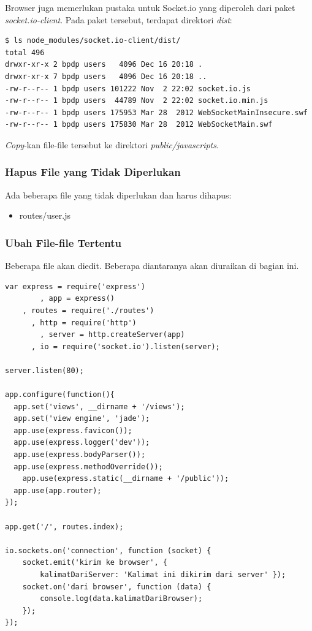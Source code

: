 Browser juga memerlukan pustaka untuk Socket.io yang diperoleh dari paket \textit{socket.io-client}. Pada paket tersebut, terdapat direktori \textit{dist}:

\lstset{language=Bash,caption=Isi direktori dist di socket.io-client}
\begin{lstlisting}
$ ls node_modules/socket.io-client/dist/
total 496
drwxr-xr-x 2 bpdp users   4096 Dec 16 20:18 .
drwxr-xr-x 7 bpdp users   4096 Dec 16 20:18 ..
-rw-r--r-- 1 bpdp users 101222 Nov  2 22:02 socket.io.js
-rw-r--r-- 1 bpdp users  44789 Nov  2 22:02 socket.io.min.js
-rw-r--r-- 1 bpdp users 175953 Mar 28  2012 WebSocketMainInsecure.swf
-rw-r--r-- 1 bpdp users 175830 Mar 28  2012 WebSocketMain.swf
\end{lstlisting}

\textit{Copy}-kan file-file tersebut ke direktori \textit{public/javascripts}.

\subsubsection{Hapus File yang Tidak Diperlukan}

Ada beberapa file yang tidak diperlukan dan harus dihapus:
\begin{itemize}
	\item routes/user.js
\end{itemize}

\subsubsection{Ubah File-file Tertentu}

Beberapa file akan diedit. Beberapa diantaranya akan diuraikan di bagian ini.

\lstset{language=JavaScript,caption=app.js}
\begin{lstlisting}
var express = require('express')
		, app = express()
  	, routes = require('./routes')
	  , http = require('http')
		, server = http.createServer(app)
	  , io = require('socket.io').listen(server);

server.listen(80);

app.configure(function(){
  app.set('views', __dirname + '/views');
  app.set('view engine', 'jade');
  app.use(express.favicon());
  app.use(express.logger('dev'));
  app.use(express.bodyParser());
  app.use(express.methodOverride());
	app.use(express.static(__dirname + '/public'));
  app.use(app.router);
});

app.get('/', routes.index);

io.sockets.on('connection', function (socket) {
	socket.emit('kirim ke browser', { 
		kalimatDariServer: 'Kalimat ini dikirim dari server' });
	socket.on('dari browser', function (data) {
		console.log(data.kalimatDariBrowser);
	});
});
\end{lstlisting}

